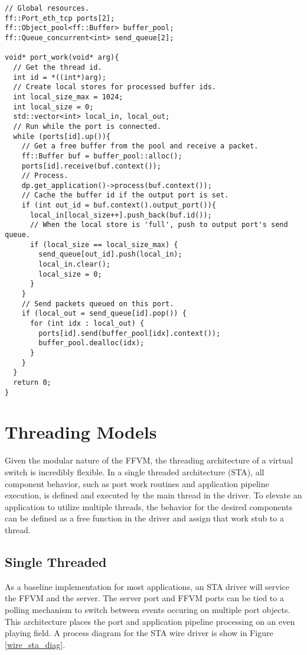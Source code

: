 \begin{lstlisting}
// Global resources.
ff::Port_eth_tcp ports[2];
ff::Object_pool<ff::Buffer> buffer_pool;
ff::Queue_concurrent<int> send_queue[2];

void* port_work(void* arg){
  // Get the thread id.
  int id = *((int*)arg);
  // Create local stores for processed buffer ids.
  int local_size_max = 1024;
  int local_size = 0;
  std::vector<int> local_in, local_out;
  // Run while the port is connected.
  while (ports[id].up()){
    // Get a free buffer from the pool and receive a packet.
    ff::Buffer buf = buffer_pool::alloc();
    ports[id].receive(buf.context());
    // Process.
    dp.get_application()->process(buf.context());
    // Cache the buffer id if the output port is set.
    if (int out_id = buf.context().output_port()){
      local_in[local_size++].push_back(buf.id());
      // When the local store is 'full', push to output port's send queue.
      if (local_size == local_size_max) {
        send_queue[out_id].push(local_in);
        local_in.clear();
        local_size = 0;
      }
    }
    // Send packets queued on this port.
    if (local_out = send_queue[id].pop()) {
      for (int idx : local_out) {
        ports[id].send(buffer_pool[idx].context());
        buffer_pool.dealloc(idx);
      }
    }
  }
  return 0;
}
\end{lstlisting}


\section{Threading Models}
\label{expr:models}
Given the modular nature of the FFVM, the threading architecture of a virtual
switch is incredibly flexible. In a single threaded architecture (STA), all
component behavior, such as port work routines and application pipeline
execution, is defined and executed by the main thread in the driver. To elevate
an application to utilize multiple threads, the behavior for the desired
components can be defined as a free function in the driver and assign that
work stub to a thread.

\subsection{Single Threaded}
\label{expr:models-single}
As a baseline implementation for most applications, an STA driver will service
the FFVM and the server. The server port and FFVM ports can be tied to a polling
mechanism to switch between events occuring on multiple port objects. This
architecture places the port and application pipeline processing on an even
playing field. A process diagram for the STA wire driver is show in Figure
\ref{wire_sta_diag}.

